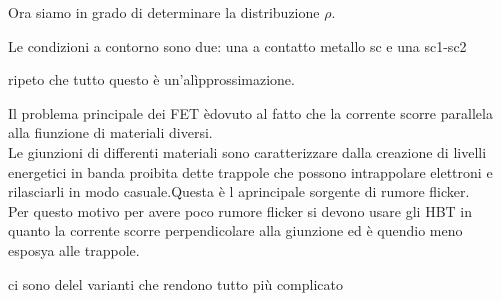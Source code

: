 Ora siamo in grado di determinare la distribuzione $\rho$.

Le condizioni a contorno sono due: una a contatto metallo sc e una sc1-sc2

ripeto che tutto questo è un'alìpprossimazione.\\
\begin{ripasso}
    Il problema principale dei FET  èdovuto al fatto che la corrente scorre parallela alla fiunzione di materiali diversi.\\
Le giunzioni di differenti materiali sono caratterizzare dalla creazione di livelli energetici in banda proibita dette trappole che possono intrappolare elettroni e rilasciarli in modo casuale.Questa è l aprincipale sorgente di rumore flicker.\\
Per questo motivo per avere poco rumore flicker si devono usare gli HBT in quanto la corrente scorre perpendicolare alla giunzione ed è quendio meno esposya alle trappole.

\end{ripasso}
ci sono delel varianti che rendono tutto più complicato\\
